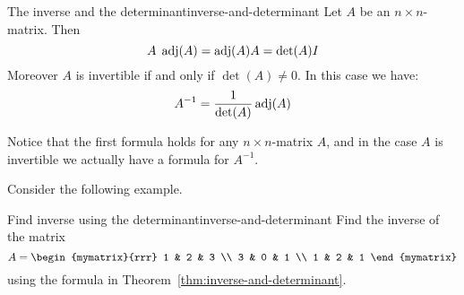 \begin{theorem}{The inverse and the determinant}{inverse-and-determinant}
  Let $A$ be an $n\times n$-matrix. Then
  \begin{equation*}
    A \; \adj(A) = \adj(A)A = {\det(A)} I
  \end{equation*}
  Moreover $A$ is invertible if and only if $\det(A) \neq 0$. In this
  case%
   we have:
  \begin{equation*}
    A^{-1} = \frac{1}{\det(A)} \adj(A)
  \end{equation*}
\end{theorem}


Notice that the first formula holds for any $n \times n$-matrix $A$,
and in the case $A$ is invertible we actually have a formula for
$A^{-1}$.

Consider the following example.

\begin{example}{Find inverse using the determinant}{inverse-and-determinant}
  Find the inverse of the matrix
  \begin{equation*}
    A=\begin{mymatrix}{rrr}
      1 & 2 & 3 \\
      3 & 0 & 1 \\
      1 & 2 & 1
    \end{mymatrix}
  \end{equation*}
  using the formula in Theorem~\ref{thm:inverse-and-determinant}.
\end{example}

